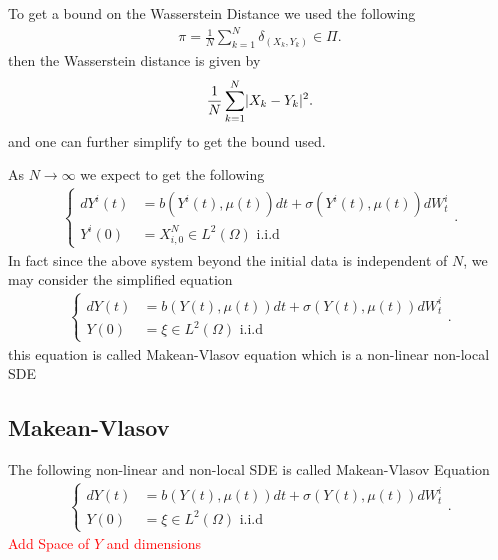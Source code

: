 \begin{remark}
 To get a bound on the Wasserstein Distance we used the following  
  \begin{align*}
    \pi  = \frac{1}{N} \sum_{k=1}^{N} \delta_{(X_k,Y_k)}  \in  \Pi
  .\end{align*}
  then  the Wasserstein distance is given by 
  \begin{align*}
   \frac{1}{N}\sum_{k=1}^{N} \lvert X_k-Y_k\rvert^2  
  .\end{align*}
  and one can further simplify to get the bound used.
\end{remark}
\begin{remark}
  As $N \to \infty$ we expect to get the following 
  \begin{align*}
    \begin{cases}
      dY^{i}(t) &= b(Y^{i}(t) ,\mu(t) ) dt + \sigma(Y^{i}(t),\mu(t) )dW_t^i \\
      Y^{i}(0)  &=  X_{i,0}^{N} \in  L^2(\Omega ) \text{ i.i.d} 
    \end{cases}
  .\end{align*}
  In fact since the above system beyond the initial data is independent of $N$, we may consider the simplified equation
  \begin{align*}
    \begin{cases}
      dY(t) &= b(Y(t) ,\mu(t) ) dt + \sigma(Y(t),\mu(t) )dW_t^i \\
      Y(0)  &=  \xi \in  L^2(\Omega ) \text{ i.i.d} 
    \end{cases}
  .\end{align*}
this equation is called Makean-Vlasov equation which is a non-linear non-local SDE
\end{remark}
\newpage
\subsection{Makean-Vlasov}
\begin{definition}
  The following non-linear and non-local SDE is called Makean-Vlasov Equation 
\begin{align*}
    \begin{cases}
      dY(t) &= b(Y(t) ,\mu(t) ) dt + \sigma(Y(t),\mu(t) )dW_t^i \\
      Y(0)  &=  \xi \in  L^2(\Omega ) \text{ i.i.d} 
    \end{cases}
  .\end{align*}  
\textcolor{Red}{Add Space of $Y$ and dimensions} 
\end{definition}

